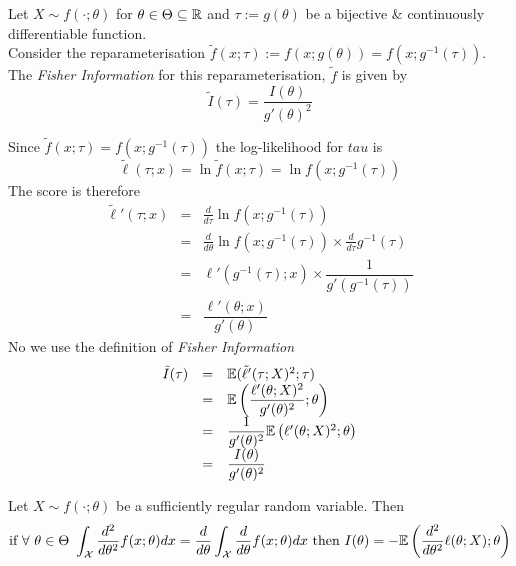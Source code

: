\documentclass[11pt,a4paper]{article}
\begin{document}
Let $X\sim f(\cdot;\theta)$ for $\theta\in\Theta\subseteq\mathbb{R}$ and $\tau:=g(\theta)$ be a bijective \& continuously differentiable function.\\
Consider the reparameterisation $\tilde{f}(x;\tau):=f(x;g(\theta))=f(x;g^{-1}(\tau))$.\\
The \textit{Fisher Information} for this reparameterisation, $\tilde{f}$ is given by
$$\tilde{I}(\tau)=\frac{I(\theta)}{g'(\theta)^2}$$

Since $\tilde{f}(x;\tau)=f(x;g^{-1}(\tau))$ the log-likelihood for $tau$ is
$$\tilde\ell(\tau;x)=\ln\tilde{f}(x;\tau)=\ln f(x;g^{-1}(\tau))$$
The score is therefore
\[\begin{array}{rcl}
\tilde\ell'(\tau;x)&=&\frac{d}{d\tau}\ln f(x;g^{-1}(\tau))\\
&=&\frac{d}{d\theta}\ln f(x;g^{-1}(\tau))\times\frac{d}{d\tau}g^{-1}(\tau)\\
&=&\ell'(g^{-1}(\tau);x)\times\dfrac{1}{g'(g^{-1}(\tau))}\\
&=&\dfrac{\ell'(\theta;x)}{g'(\theta)}
\end{array}\]
No we use the definition of \textit{Fisher Information}
\[\begin{array}{rcl}
\tilde{I}(\tau)&=&\mathbb{E}(\tilde\ell'(\tau;X)^2;\tau)\\
&=&\mathbb{E}\left(\dfrac{\ell'(\theta;X)^2}{g'(\theta)^2};\theta\right)\\
&=&\dfrac{1}{g'(\theta)^2}\mathbb{E}\left(\ell'(\theta;X)^2;\theta\right)\\
&=&\dfrac{I(\theta)}{g'(\theta)^2}
\end{array}\]

Let $X\sim f(\cdot;\theta)$ be a sufficiently regular random variable. Then
$$\text{if }\forall\ \theta\in\Theta\ \int_\mathcal{X}\frac{d^2}{d\theta^2}f(x;\theta)dx=\frac{d}{d\theta}\int_\mathcal{X}\frac{d}{d\theta}f(x;\theta)dx\text{ then }I(\theta)=-\expect\left(\frac{d^2}{d\theta^2}\ell(\theta;X);\theta\right)$$
\end{document}
